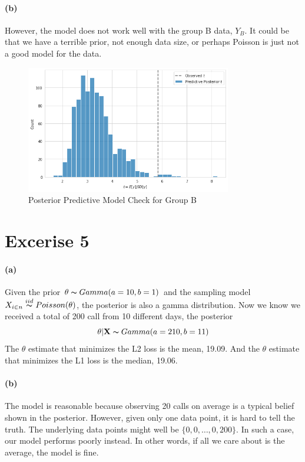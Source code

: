 \documentclass[11pt, letterpaper]{article}
\begin{document}
\paragraph{(b)}
However, the model does not work well with the group B data, $Y_B$. It could be that we have a terrible prior,
not enough data size, or perhaps Poisson is just not a good model for the data.

\begin{figure}[!h]
  \centering
  \includegraphics[width=0.8\textwidth]{4.3.b.png}
  \captionsetup{justification=centering}
  \caption{Posterior Predictive Model Check for Group B}
\end{figure}
\newpage


\section{Excerise 5}
\paragraph{(a)}
Given the prior $\theta \thicksim Gamma(a=10, b=1)$ and the sampling model
$X_{i \in n} \overset{iid}{\thicksim} Poisson(\theta)$, the posterior is also a gamma distribution.
Now we know we received a total of 200 call from 10 different days, the posterior
\[ \theta|\mathbf{X} \thicksim Gamma(a=210, b=11) \]
The $\theta$ estimate that minimizes the L2 loss is the mean, 19.09. And the $\theta$ estimate
that minimizes the L1 loss is the median, 19.06.

\paragraph{(b)}
The model is reasonable because observing 20 calls on average is a typical belief shown in the posterior.
However, given only one data point, it is hard to tell the truth. The underlying data points might well be
$\{0, 0, \dots, 0, 200\}$. In such a case, our model performs poorly instead. In other words, if all we
care about is the average, the model is fine.
\end{document}
